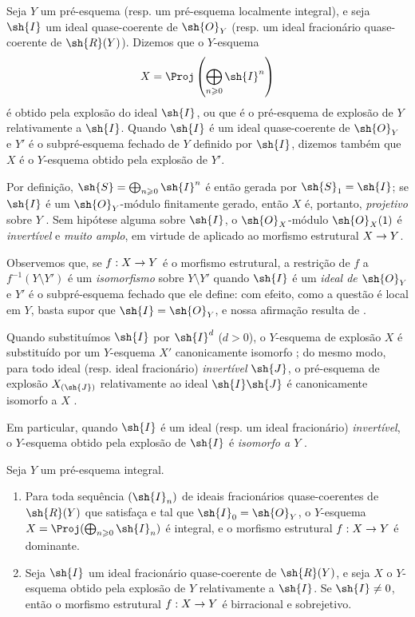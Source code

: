 \documentclass[oneside,10pt]{amsart}
\makeatletter
\renewcommand{\geq}{\geqslant}
\newcommand{\ega@arrow}[2]{\mathchoice{#1}{#2}{#2}{#2}}
\renewcommand{\to}{\ega@arrow{\longrightarrow}{\rightarrow}}
\newcommand{\oldpage}[2][]{\marginnote{\normalfont\footnotesize\textbf{#1}~|~#2}\ignorespaces}
\let\EGAOriginalLabel\label
\renewcommand{\label}[1]{\phantomsection\EGAOriginalLabel{#1}}
\makeatother
\begin{document}
\begin{definition}[8.1.3]
\label{II.8.1.3}
Seja $Y$ um pré-esquema (resp. um pré-esquema localmente integral), e seja $\sh{I}$ um ideal quase-coerente de $\sh{O}_Y$ (resp. um ideal fracionário quase-coerente de $\sh{R}(Y)$).
Dizemos que o $Y$-esquema
\[
  X=\Proj\left(\bigoplus_{n\geq0}\sh{I}^n\right)
\]
é obtido pela explosão do ideal $\sh{I}$, ou que é o pré-esquema de explosão de $Y$ relativamente a $\sh{I}$.
Quando $\sh{I}$ é um ideal quase-coerente de $\sh{O}_Y$ e $Y'$ é o subpré-esquema fechado de $Y$ definido por $\sh{I}$, dizemos também que $X$ é o $Y$-esquema obtido pela explosão de $Y'$.
\end{definition}

Por definição, $\sh{S}=\bigoplus_{n\geq0}\sh{I}^n$ é então gerada por $\sh{S}_1=\sh{I}$;
se $\sh{I}$ é um $\sh{O}_Y$-módulo finitamente gerado, então $X$ é, portanto, \emph{projetivo} sobre $Y$ .
Sem hipótese alguma sobre $\sh{I}$, o $\sh{O}_X$-módulo $\sh{O}_X(1)$ é \emph{invertível}  e \emph{muito amplo}, em virtude de  aplicado ao morfismo estrutural $X\to Y$.

Observemos que, se $f:X\to Y$ é o morfismo estrutural, a restrição de $f$ a $f^{-1}(Y\setminus Y')$ é um \emph{isomorfismo} sobre $Y\setminus Y'$ quando $\sh{I}$ é um \emph{ideal de $\sh{O}_Y$} e $Y'$ é o subpré-esquema fechado que ele define:
com efeito, como a questão é local em $Y$, basta supor que $\sh{I}=\sh{O}_Y$, e nossa afirmação resulta de .

Quando substituímos $\sh{I}$ por $\sh{I}^d$ ($d>0$), o $Y$-esquema de explosão $X$ é substituído por um $Y$-esquema $X'$ canonicamente isomorfo ;
do mesmo modo, para todo ideal (resp. ideal fracionário) \emph{invertível} $\sh{J}$, o pré-esquema de explosão $X_{(\sh{J})}$ relativamente ao ideal $\sh{I}\sh{J}$ é canonicamente isomorfo a $X$ .

Em particular, quando $\sh{I}$ é um ideal (resp. um ideal fracionário) \emph{invertível}, o $Y$-esquema obtido pela explosão de $\sh{I}$ é \emph{isomorfo a $Y$} .

\begin{proposition}[8.1.4]
\label{II.8.1.4}
Seja $Y$ um pré-esquema integral.
\begin{enumerate}
    \item[\rm{(i)}] Para toda sequência $(\sh{I}_n)$ de ideais fracionários quase-coerentes de $\sh{R}(Y)$ que satisfaça 
\oldpage[II]{154}
        e tal que $\sh{I}_0=\sh{O}_Y$, o $Y$-esquema $X=\Proj(\bigoplus_{n\geq0}\sh{I}_n)$ é integral, e o morfismo estrutural $f:X\to Y$ é dominante.
    \item[\rm{(ii)}] Seja $\sh{I}$ um ideal fracionário quase-coerente de $\sh{R}(Y)$, e seja $X$ o $Y$-esquema obtido pela explosão de $Y$ relativamente a $\sh{I}$.
        Se $\sh{I}\neq0$, então o morfismo estrutural $f:X\to Y$ é birracional e sobrejetivo.
\end{enumerate}
\end{proposition}
\end{document}
